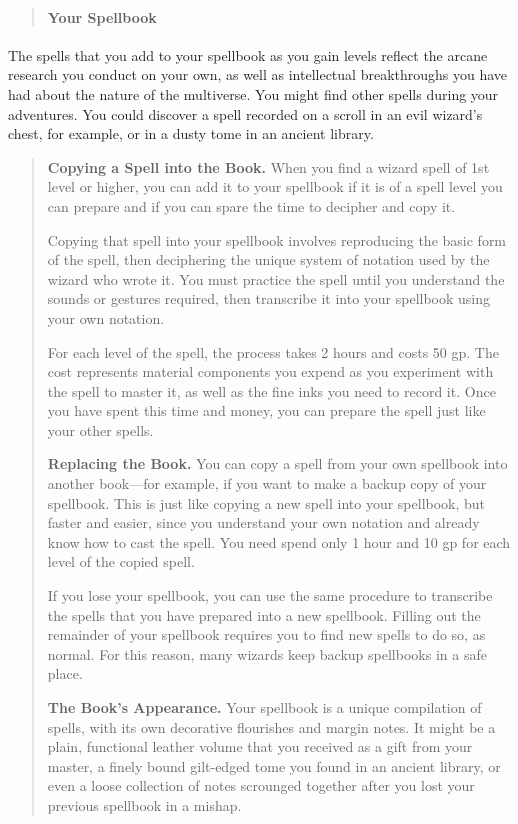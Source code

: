 \documentclass[
]{article}
\begin{document}
\begin{quote}
\mbox{}%
\hypertarget{your-spellbook}{%
\paragraph{Your Spellbook}\label{your-spellbook}}
\end{quote}

The spells that you add to your spellbook as you gain levels reflect the
arcane research you conduct on your own, as well as intellectual
breakthroughs you have had about the nature of the multiverse. You might
find other spells during your adventures. You could discover a spell
recorded on a scroll in an evil wizard's chest, for example, or in a
dusty tome in an ancient library.

\begin{quote}
\textbf{Copying a Spell into the Book.} When you find a wizard spell of
1st level or higher, you can add it to your spellbook if it is of a
spell level you can prepare and if you can spare the time to decipher
and copy it.

Copying that spell into your spellbook involves reproducing the basic
form of the spell, then deciphering the unique system of notation used
by the wizard who wrote it. You must practice the spell until you
understand the sounds or gestures required, then transcribe it into your
spellbook using your own notation.

For each level of the spell, the process takes 2 hours and costs 50 gp.
The cost represents material components you expend as you experiment
with the spell to master it, as well as the fine inks you need to record
it. Once you have spent this time and money, you can prepare the spell
just like your other spells.

\textbf{Replacing the Book.} You can copy a spell from your own
spellbook into another book---for example, if you want to make a backup
copy of your spellbook. This is just like copying a new spell into your
spellbook, but faster and easier, since you understand your own notation
and already know how to cast the spell. You need spend only 1 hour and
10 gp for each level of the copied spell.

If you lose your spellbook, you can use the same procedure to transcribe
the spells that you have prepared into a new spellbook. Filling out the
remainder of your spellbook requires you to find new spells to do so, as
normal. For this reason, many wizards keep backup spellbooks in a safe
place.

\textbf{The Book's Appearance.} Your spellbook is a unique compilation
of spells, with its own decorative flourishes and margin notes. It might
be a plain, functional leather volume that you received as a gift from
your master, a finely bound gilt-edged tome you found in an ancient
library, or even a loose collection of notes scrounged together after
you lost your previous spellbook in a mishap.
\end{quote}
\end{document}
